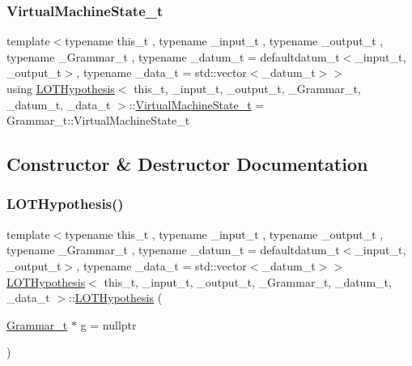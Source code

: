\subsubsection{\texorpdfstring{Virtual\+Machine\+State\+\_\+t}{VirtualMachineState\_t}}
{\footnotesize\ttfamily template$<$typename this\+\_\+t , typename \+\_\+input\+\_\+t , typename \+\_\+output\+\_\+t , typename \+\_\+\+Grammar\+\_\+t , typename \+\_\+datum\+\_\+t  = defaultdatum\+\_\+t$<$\+\_\+input\+\_\+t, \+\_\+output\+\_\+t$>$, typename \+\_\+data\+\_\+t  = std\+::vector$<$\+\_\+datum\+\_\+t$>$$>$ \\
using \hyperlink{class_l_o_t_hypothesis}{L\+O\+T\+Hypothesis}$<$ this\+\_\+t, \+\_\+input\+\_\+t, \+\_\+output\+\_\+t, \+\_\+\+Grammar\+\_\+t, \+\_\+datum\+\_\+t, \+\_\+data\+\_\+t $>$\+::\hyperlink{class_l_o_t_hypothesis_a9121619ee7a99c2c5a177e38e3e098fc}{Virtual\+Machine\+State\+\_\+t} =  Grammar\+\_\+t\+::\+Virtual\+Machine\+State\+\_\+t}



\subsection{Constructor \& Destructor Documentation}
\mbox{\label{class_l_o_t_hypothesis_afdec7677defa1f7b860ec8708ce0775e}} 
\subsubsection{\texorpdfstring{L\+O\+T\+Hypothesis()}{LOTHypothesis()}\hspace{0.1cm}{\footnotesize\ttfamily [1/4]}}
{\footnotesize\ttfamily template$<$typename this\+\_\+t , typename \+\_\+input\+\_\+t , typename \+\_\+output\+\_\+t , typename \+\_\+\+Grammar\+\_\+t , typename \+\_\+datum\+\_\+t  = defaultdatum\+\_\+t$<$\+\_\+input\+\_\+t, \+\_\+output\+\_\+t$>$, typename \+\_\+data\+\_\+t  = std\+::vector$<$\+\_\+datum\+\_\+t$>$$>$ \\
\hyperlink{class_l_o_t_hypothesis}{L\+O\+T\+Hypothesis}$<$ this\+\_\+t, \+\_\+input\+\_\+t, \+\_\+output\+\_\+t, \+\_\+\+Grammar\+\_\+t, \+\_\+datum\+\_\+t, \+\_\+data\+\_\+t $>$\+::\hyperlink{class_l_o_t_hypothesis}{L\+O\+T\+Hypothesis} (\begin{DoxyParamCaption}\item[{\hyperlink{class_l_o_t_hypothesis_a5393058e614835e0f139bd40acb183b2}{Grammar\+\_\+t} $\ast$}]{g = {\ttfamily nullptr} }\end{DoxyParamCaption})\hspace{0.3cm}{\ttfamily [inline]}}

